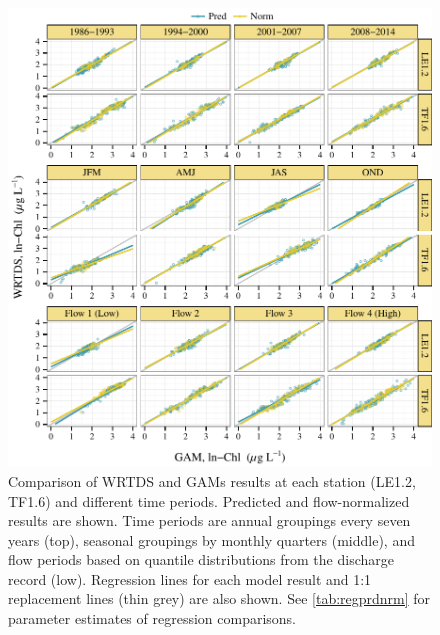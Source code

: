 \documentclass[letterpaper,12pt,oneside]{article}\usepackage[]{graphicx}\usepackage[]{color}
\makeatletter
\def\maxwidth{ %
  \ifdim\Gin@nat@width>\linewidth
    \linewidth
  \else
    \Gin@nat@width
  \fi
}
\makeatother
\begin{document}
\begin{figure}[!ht]

{\centering \includegraphics[width=\maxwidth]{figs/regprdnrm-1} 

}

\caption{Comparison of \ac{WRTDS} and \acp{GAM} results at each station (LE1.2, TF1.6) and different time periods.  Predicted and flow-normalized results are shown.  Time periods are annual groupings every seven years (top), seasonal groupings by monthly quarters (middle), and flow periods based on quantile distributions from the discharge record (low).  Regression lines for each model result and 1:1 replacement lines (thin grey) are also shown.  See \cref{tab:regprdnrm} for parameter estimates of regression comparisons.}\label{fig:regprdnrm}
\end{figure}
\end{document}
